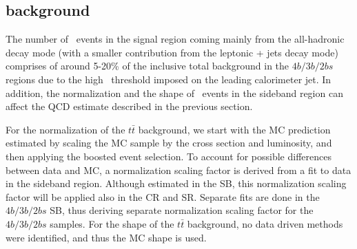 




\pagebreak{}
\subsection{\ttbar background}
\label{sec:boosted-ttbar}

The number of \ttbar\ events in the signal region coming mainly from the all-hadronic decay mode (with a smaller contribution from the leptonic + jets decay mode) comprises of  around 5-20\%  of the inclusive total background in the $4b/3b/2bs$ regions due to the high \pt\ threshold imposed on the leading \largeR calorimeter jet. In addition, the normalization and the shape of \ttbar\ events in the sideband region can affect the QCD estimate described in the previous section.

For the normalization of the $t\bar{t}$ background, we start with the MC prediction estimated by scaling the MC sample by the cross section and luminosity, and then applying the boosted event selection.  To account for possible differences between data and MC, a normalization scaling factor  is derived from a fit to data in the sideband region.  Although estimated in the SB, this normalization scaling factor will be applied also in the CR and SR.  Separate fits are done in the $4b/3b/2bs$  SB, thus deriving separate normalization scaling factor for the $4b/3b/2bs$ samples. For the shape of the $t\bar{t}$ background, no data driven methods were identified, and thus the MC shape is used.  

